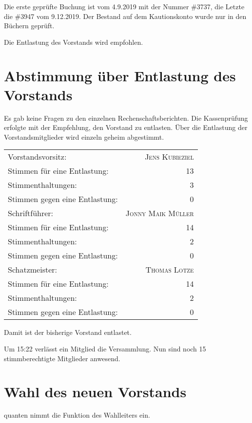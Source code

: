 \documentclass[DIV=calc,parksip=half*]{scrartcl}
\newcommand{\qbi}{Jens Kubieziel}
\newcommand{\jonny}{Jonny Maik Müller}
\newcommand{\thomas}{Thomas Lotze}
\newcommand{\quanten}{quanten}
\begin{document}
Die erste geprüfte Buchung ist vom 4.9.2019 mit der Nummer \#3737,
die Letzte die \#3947 vom 9.12.2019.
Der Bestand auf dem Kautionskonto wurde nur in den Büchern geprüft.

Die Entlastung des Vorstands wird empfohlen.

\section{Abstimmung über Entlastung des Vorstands}

Es gab keine Fragen zu den einzelnen Rechenschaftsberichten.
Die Kassenprüfung erfolgte mit der Empfehlung, den Vorstand zu entlasten.
Über die Entlastung der Vorstandsmitglieder wird einzeln geheim abgestimmt.

  \begin{tabularx}{\linewidth}{Xr}
    \toprule
    Vorstandsvorsitz: & \textsc{\qbi{}}\\
    Stimmen für eine Entlastung: & 13 \\
    Stimmenthaltungen: & 3 \\
    Stimmen gegen eine Entlastung: & 0\\
    \midrule
    Schriftführer: & \textsc{\jonny{}}\\
    Stimmen für eine Entlastung: & 14 \\
    Stimmenthaltungen: & 2 \\
    Stimmen gegen eine Entlastung: & 0\\
    \midrule
    Schatzmeister: & \textsc{\thomas{}}\\
    Stimmen für eine Entlastung: & 14 \\
    Stimmenthaltungen: & 2 \\
    Stimmen gegen eine Entlastung: & 0\\
    \bottomrule
\end{tabularx}
Damit ist der bisherige Vorstand entlastet.

Um 15:22 verlässt ein Mitglied die Versammlung. Nun sind noch 15 stimmberechtigte Mitglieder anwesend.

\section{Wahl des neuen Vorstands}

\quanten{} nimmt die Funktion des Wahlleiters ein.
\end{document}
